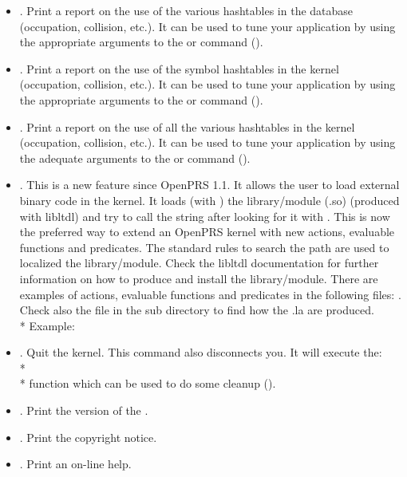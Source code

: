 \begin{itemize}
\item {}. Print a report on the use of the
various hashtables in the database (occupation, collision, etc.). It can be
used to tune your application by using the appropriate arguments to the
 or  command ().

\item {}. Print a report on the use of the
symbol hashtables in the kernel (occupation, collision, etc.). It can be used
to tune your application by using the appropriate arguments to the 
or  command ().

\item {}. Print a report on the use of all
the various hashtables in the kernel (occupation, collision, etc.). It can be
used to tune your application by using the adequate arguments to the 
or  command ().

\item {}. This is a new
  feature since OpenPRS 1.1. It allows the user to load external binary code in
  the kernel. It loads (with ) the library/module (.so)
   (produced with libltdl) and try to call the string
   after looking for it with . This is now the
  preferred way to extend an OpenPRS kernel with new actions, evaluable
  functions and predicates. The standard rules to search the path are used to
  localized the  library/module. Check the libltdl
  documentation for further information on how to produce and install the
  library/module. There are examples of actions, evaluable functions and
  predicates in the following files: 
   . Check also the
   file in the  sub directory to find how the .la
  are produced.\\*
Example: 


\item {}. Quit the kernel. This command also disconnects
you. It will execute the:\\*
\\*
function which can be used to do some cleanup ().

\item {}. Print the version of the \CPK{}.

\item {}. Print the copyright notice.

\item {}. Print an on-line help.

\end{itemize}

